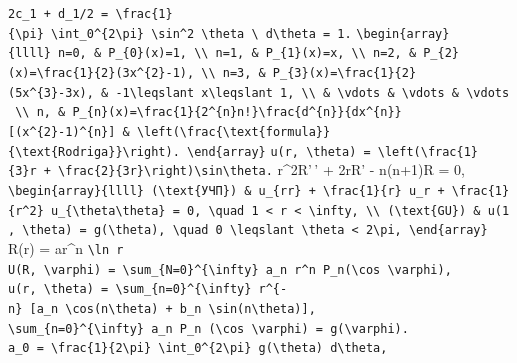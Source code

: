 \documentclass[
  ukrainian,
]{article}
\begin{document}
\texttt{2c\_1\ +\ d\_1/2\ =\ \textbackslash{}frac\{1\}\{\textbackslash{}pi\}\ \textbackslash{}int\_0\^{}\{2\textbackslash{}pi\}\ \textbackslash{}sin\^{}2\ \textbackslash{}theta\ \textbackslash{}\ d\textbackslash{}theta\ =\ 1.}
\texttt{\textbackslash{}begin\{array\}\{llll\}\ n=0,\ \&\ P\_\{0\}(x)=1,\ \textbackslash{}\textbackslash{}\ n=1,\ \&\ P\_\{1\}(x)=x,\ \textbackslash{}\textbackslash{}\ n=2,\ \&\ P\_\{2\}(x)=\textbackslash{}frac\{1\}\{2\}(3x\^{}\{2\}-1),\ \textbackslash{}\textbackslash{}\ n=3,\ \&\ P\_\{3\}(x)=\textbackslash{}frac\{1\}\{2\}(5x\^{}\{3\}-3x),\ \&\ -1\textbackslash{}leqslant\ x\textbackslash{}leqslant\ 1,\ \textbackslash{}\textbackslash{}\ \&\ \textbackslash{}vdots\ \&\ \textbackslash{}vdots\ \&\ \textbackslash{}vdots\ \textbackslash{}\textbackslash{}\ n,\ \&\ P\_\{n\}(x)=\textbackslash{}frac\{1\}\{2\^{}\{n\}n!\}\textbackslash{}frac\{d\^{}\{n\}\}\{dx\^{}\{n\}\}{[}(x\^{}\{2\}-1)\^{}\{n\}{]}\ \&\ \textbackslash{}left(\textbackslash{}frac\{\textbackslash{}text\{formula\}\}\{\textbackslash{}text\{Rodriga\}\}\textbackslash{}right).\ \textbackslash{}end\{array\}}
\texttt{u(r,\ \textbackslash{}theta)\ =\ \textbackslash{}left(\textbackslash{}frac\{1\}\{3\}r\ +\ \textbackslash{}frac\{2\}\{3r\}\textbackslash{}right)\textbackslash{}sin\textbackslash{}theta.}
r\^{}2R'\,' + 2rR' - n(n+1)R = 0,
\texttt{\textbackslash{}begin\{array\}\{llll\}\ (\textbackslash{}text\{УЧП\})\ \&\ u\_\{rr\}\ +\ \textbackslash{}frac\{1\}\{r\}\ u\_r\ +\ \textbackslash{}frac\{1\}\{r\^{}2\}\ u\_\{\textbackslash{}theta\textbackslash{}theta\}\ =\ 0,\ \textbackslash{}quad\ 1\ \textless{}\ r\ \textless{}\ \textbackslash{}infty,\ \textbackslash{}\textbackslash{}\ (\textbackslash{}text\{GU\})\ \&\ u(1,\ \textbackslash{}theta)\ =\ g(\textbackslash{}theta),\ \textbackslash{}quad\ 0\ \textbackslash{}leqslant\ \textbackslash{}theta\ \textless{}\ 2\textbackslash{}pi,\ \textbackslash{}end\{array\}}
R(r) = ar\^{}n \texttt{\textbackslash{}ln\ r}
\texttt{U(R,\ \textbackslash{}varphi)\ =\ \textbackslash{}sum\_\{N=0\}\^{}\{\textbackslash{}infty\}\ a\_n\ r\^{}n\ P\_n(\textbackslash{}cos\ \textbackslash{}varphi),}
\texttt{u(r,\ \textbackslash{}theta)\ =\ \textbackslash{}sum\_\{n=0\}\^{}\{\textbackslash{}infty\}\ r\^{}\{-n\}\ {[}a\_n\ \textbackslash{}cos(n\textbackslash{}theta)\ +\ b\_n\ \textbackslash{}sin(n\textbackslash{}theta){]},}
\texttt{\textbackslash{}sum\_\{n=0\}\^{}\{\textbackslash{}infty\}\ a\_n\ P\_n\ (\textbackslash{}cos\ \textbackslash{}varphi)\ =\ g(\textbackslash{}varphi).}
\texttt{a\_0\ =\ \textbackslash{}frac\{1\}\{2\textbackslash{}pi\}\ \textbackslash{}int\_0\^{}\{2\textbackslash{}pi\}\ g(\textbackslash{}theta)\ d\textbackslash{}theta,}
\end{document}
